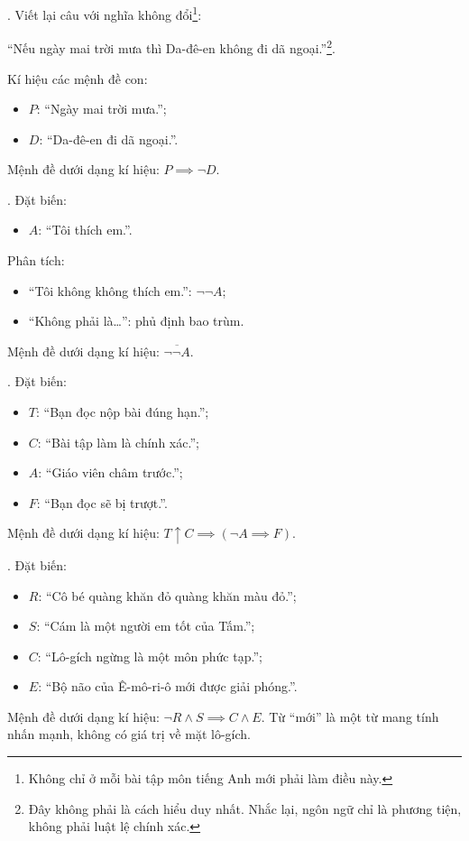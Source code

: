 . Viết lại câu với nghĩa không đổi\footnote{Không chỉ ở mỗi bài tập môn tiếng Anh mới phải làm điều này.}: 
\begin{center}
    ``Nếu ngày mai trời mưa thì Da-đê-en không đi dã ngoại.''\footnote{Đây không phải là cách hiểu duy nhất. Nhắc lại, ngôn ngữ chỉ là phương tiện, không phải luật lệ chính xác.}.
\end{center}
Kí hiệu các mệnh đề con:
\begin{itemize}
    \item $P$: ``Ngày mai trời mưa.'';
    \item $D$: ``Da-đê-en đi dã ngoại.''.
\end{itemize}
Mệnh đề dưới dạng kí hiệu: $P \implies \neg D$.

. Đặt biến:
\begin{itemize}
    \item $A$: ``Tôi thích em.''.
\end{itemize}
Phân tích:
\begin{itemize}
    \item ``Tôi không không thích em.'': $\neg \neg A$;
    \item ``Không phải là\dots'': phủ định bao trùm.
\end{itemize}
Mệnh đề dưới dạng kí hiệu: $\overline{\neg \neg A}$.

. Đặt biến:
\begin{itemize}
    \item $T$: ``Bạn đọc nộp bài đúng hạn.'';
    \item $C$: ``Bài tập làm là chính xác.'';
    \item $A$: ``Giáo viên châm trước.'';
    \item $F$: ``Bạn đọc sẽ bị trượt.''.
\end{itemize}
Mệnh đề dưới dạng kí hiệu: $T \uparrow C \implies (\neg A \implies F)$.

. Đặt biến:
\begin{itemize}
    \item $R$: ``Cô bé quàng khăn đỏ quàng khăn màu đỏ.'';
    \item $S$: ``Cám là một người em tốt của Tấm.'';
    \item $C$: ``Lô-gích ngừng là một môn phức tạp.'';
    \item $E$: ``Bộ não của Ê-mô-ri-ô mới được giải phóng.''.
\end{itemize}
Mệnh đề dưới dạng kí hiệu: $\neg R \land S \implies C \land E$. Từ ``mới'' là một từ mang tính nhấn mạnh, không có giá trị về mặt lô-gích.



